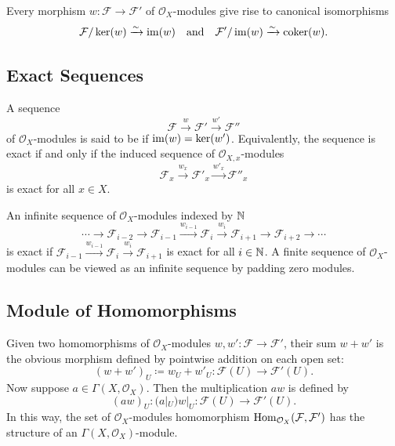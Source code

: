 \begin{proposition}
	Every morphism $w \colon \mathcal{F} \to \mathcal{F}'$ of $\mathcal{O}_X$-modules give rise to canonical isomorphisms
	\begin{equation*}
		\mathcal{F}/\ker(w) \xrightarrow{\sim} \operatorname{im}(w) \quad\text{and}\quad \mathcal{F'}/\operatorname{im}(w) \xrightarrow{\sim} \operatorname{coker}(w).
	\end{equation*}
\end{proposition}

\subsection*{Exact Sequences}
A sequence
\begin{equation*}
	\mathcal{F} \xrightarrow{w} \mathcal{F}' \xrightarrow{w'} \mathcal{F}''
\end{equation*}	
of $\mathcal{O}_X$-modules is said to be  if $\operatorname{im}(w) = \ker(w')$. Equivalently, the sequence is exact if and only if the induced sequence of $\mathcal{O}_{X, x}$-modules
\begin{equation*}
	\mathcal{F}_x \xrightarrow{w_x} \mathcal{F}'_x \xrightarrow{w'_x} \mathcal{F}''_x
\end{equation*}
is exact for all $x \in X$.

An infinite sequence of $\mathcal{O}_X$-modules indexed by $\mathbb N$
\begin{equation*}
	\dotsb \to \mathcal{F}_{i - 2} \to \mathcal{F}_{i - 1} \xrightarrow{w_{i - 1}} \mathcal{F}_i \xrightarrow{w_i} \mathcal{F}_{i + 1} \to \mathcal{F}_{i + 2} \to \dotsb
\end{equation*}
is exact if $\mathcal{F}_{i - 1} \xrightarrow{w_{i - 1}} \mathcal{F}_i \xrightarrow{w_i} \mathcal{F}_{i + 1}$ is exact for all $i \in \mathbb N$. A finite sequence of $\mathcal{O}_X$-modules can be viewed as an infinite sequence by padding zero modules.

\subsection*{Module of Homomorphisms}

Given two homomorphisms of $\mathcal{O}_X$-modules $w, w' \colon\mathcal{F} \to \mathcal{F}'$, their sum $w + w'$ is the obvious morphism defined by pointwise addition on each open set:
\begin{equation*}
	(w + w')_U \coloneqq w_U + w'_U \colon \mathcal{F}(U) \to \mathcal{F}'(U).
\end{equation*}
Now suppose $a \in \Gamma(X, \mathcal{O}_X)$. Then the multiplication $aw$ is defined by
\begin{equation*}
	(aw)_U \colon (a|_U) w|_U \colon \mathcal{F}(U) \to \mathcal{F}'(U).
\end{equation*}
In this way, the set of $\mathcal{O}_X$-modules homomorphism $\operatorname{Hom}_{\mathcal{O}_X}(\mathcal{F}, \mathcal{F}')$ has the structure of an $\Gamma(X, \mathcal{O}_X)$-module.

